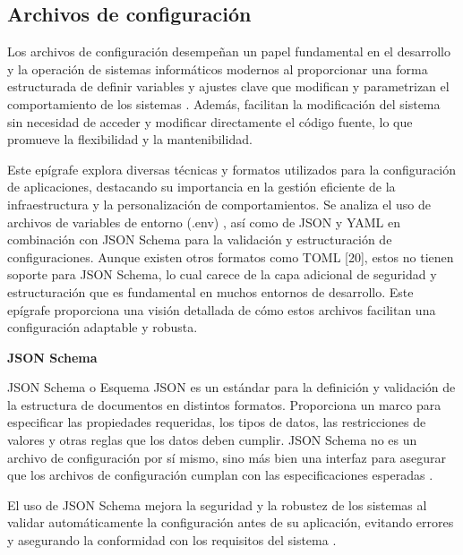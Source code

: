 \subsection{Archivos de configuración}

Los archivos de configuración desempeñan un papel fundamental en el desarrollo y la operación de sistemas informáticos modernos al proporcionar una forma estructurada de definir variables y ajustes clave que modifican y parametrizan el comportamiento de los sistemas \autocite{van_der_hoek_configurable_1999}. Además, facilitan la modificación del sistema sin necesidad de acceder y modificar directamente el código fuente, lo que promueve la flexibilidad y la mantenibilidad.

Este epígrafe explora diversas técnicas y formatos utilizados para la configuración de aplicaciones, destacando su importancia en la gestión eficiente de la infraestructura y la personalización de comportamientos. Se analiza el uso de archivos de variables de entorno (.env) \autocite{pandey_guide_2022}, así como de JSON \autocite{erickson_what_2024,bray_javascript_2014} y YAML \autocite{ben-kiki_yaml_2021,redhat_what_2023} en combinación con JSON Schema \autocite{attouche_witness_2022,json_schema_json_2024} para la validación y estructuración de configuraciones. Aunque existen otros formatos como TOML [20], estos no tienen soporte para JSON Schema, lo cual carece de la capa adicional de seguridad y estructuración que es fundamental en muchos entornos de desarrollo. Este epígrafe proporciona una visión detallada de cómo estos archivos facilitan una configuración adaptable y robusta.

\textbf{JSON Schema}

JSON Schema o Esquema JSON es un estándar para la definición y validación de la estructura de documentos en distintos formatos. Proporciona un marco para especificar las propiedades requeridas, los tipos de datos, las restricciones de valores y otras reglas que los datos deben cumplir. JSON Schema no es un archivo de configuración por sí mismo, sino más bien una interfaz para asegurar que los archivos de configuración cumplan con las especificaciones esperadas \autocite{attouche_witness_2022,json_schema_json_2024}.

El uso de JSON Schema mejora la seguridad y la robustez de los sistemas al validar automáticamente la configuración antes de su aplicación, evitando errores y asegurando la conformidad con los requisitos del sistema \autocite{attouche_witness_2022,json_schema_json_2024}.

